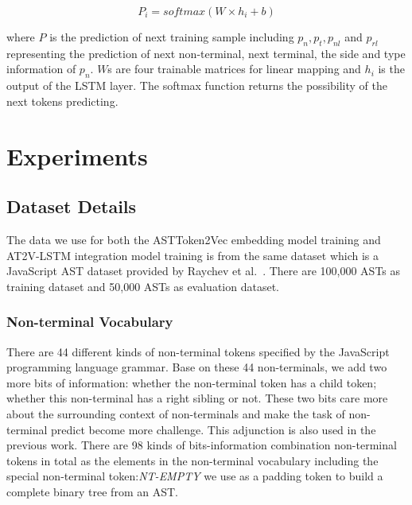 \documentclass[E]{compsoft}
\begin{document}
\begin{equation}
P_{i} = softmax(W \times h_{i} + b)
\end{equation}


where $P$ is the prediction of next training sample including $p_{n}, p_{t}, p_{nl}$ and $p_{rl}$ representing the prediction of next non-terminal, next terminal, the side and type information of $p_{n}$. 
$W$s are four trainable matrices for linear mapping and $h_{i}$ is the output of the LSTM layer.
The softmax function returns the possibility of the next tokens predicting.
 




\section{Experiments}
\label{section:experiment}
\subsection{Dataset Details}
The data we use for both the ASTToken2Vec embedding model training and AT2V-LSTM integration model training is from the same dataset which is a JavaScript AST dataset provided by Raychev et al.\  \cite{dataset}. 
There are 100,000 ASTs as training dataset and 50,000 ASTs as evaluation dataset. 

\subsubsection{Non-terminal Vocabulary} 
There are 44 different kinds of non-terminal tokens specified by the JavaScript programming language grammar. 
Base on these 44 non-terminals, we add two more bits of information: whether the non-terminal token has a child token; whether this non-terminal has a right sibling or not. 
These two bits care more about the surrounding context of non-terminals and make the task of non-terminal predict become more challenge. 
This adjunction is also used in the previous work\cite{liu2016neural}\cite{dataset}. 
There are 98 kinds of bits-information combination non-terminal tokens in total as the elements in the non-terminal vocabulary including the special non-terminal token:\textit{NT-EMPTY} we use as a padding token to build a complete binary tree from an AST.
\end{document}
